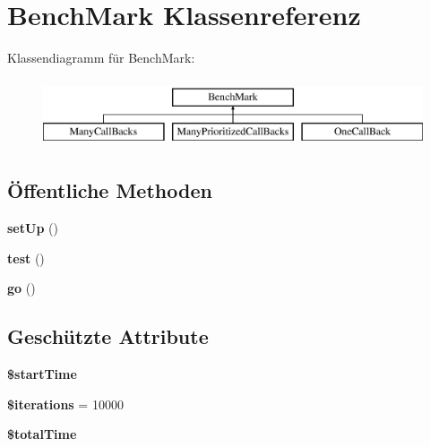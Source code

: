 \hypertarget{class_bench_mark}{}\section{Bench\+Mark Klassenreferenz}
\label{class_bench_mark}
Klassendiagramm für Bench\+Mark\+:\begin{figure}[H]
\begin{center}
\leavevmode
\includegraphics[height=2.000000cm]{class_bench_mark}
\end{center}
\end{figure}
\subsection*{Öffentliche Methoden}
\begin{DoxyCompactItemize}
\item 
\mbox{\label{class_bench_mark_a60dd969de7e7c0e881911941158724ba}} 
{\bfseries set\+Up} ()
\item 
\mbox{\label{class_bench_mark_a0ee0e7f527e7fba2bbd6aaf6cecb7524}} 
{\bfseries test} ()
\item 
\mbox{\label{class_bench_mark_a1f3af22a4a6529edd4e5a49c870e16c5}} 
{\bfseries go} ()
\end{DoxyCompactItemize}
\subsection*{Geschützte Attribute}
\begin{DoxyCompactItemize}
\item 
\mbox{\label{class_bench_mark_aa1952dec0b6d6a66c7f56a2992d648a9}} 
{\bfseries \$start\+Time}
\item 
\mbox{\label{class_bench_mark_ad86124a5745eacdc618ce940a5b93a20}} 
{\bfseries \$iterations} = 10000
\item 
\mbox{\label{class_bench_mark_af4bee1aa0114bca5adf1233cf1c77d4a}} 
{\bfseries \$total\+Time}
\end{DoxyCompactItemize}


